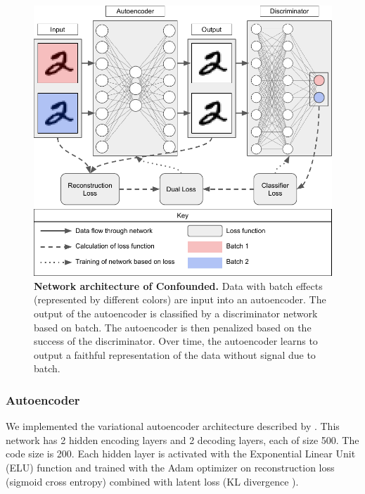 \documentclass[11pt]{article}
\begin{document}
\begin{figure}
	\centering
	\includegraphics[width=\columnwidth]{figures/static/network.pdf}
	\caption[Network architecture of Confounded]{\textbf{Network architecture of Confounded.}
	Data with batch effects (represented by different colors) are input into an autoencoder.
	The output of the autoencoder is classified by a discriminator network based on batch.
	The autoencoder is then penalized based on the success of the discriminator.
	Over time, the autoencoder learns to output a faithful representation of the data without signal due to batch.}
	\label{fig:network}
\end{figure}

\subsubsection{Autoencoder}

We implemented the variational autoencoder architecture \citep{louizos_variational_2015} described by \citet[Chapter 15]{geron_hands-machine_2017}.
This network has 2 hidden encoding layers and 2 decoding layers, each of size 500. %
The code size is 200. %
Each hidden layer is activated with the Exponential Linear Unit (ELU) function \citep{clevert_fast_2015} and trained with the Adam optimizer \citep{kingma_adam_2014} on reconstruction loss (sigmoid cross entropy) combined with latent loss (KL divergence \citep{kullback_information_1951}).
\end{document}
